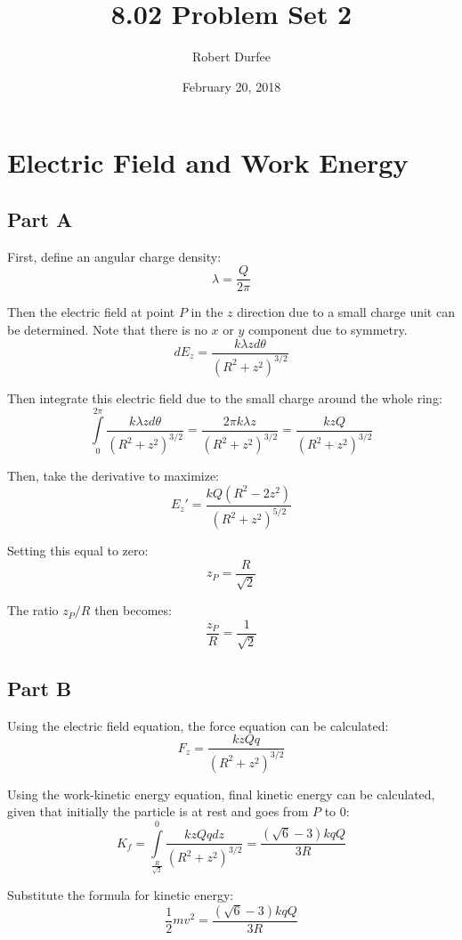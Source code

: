 \documentclass{article}
\title{ 8.02 Problem Set 2 }
\author{ Robert Durfee }
\date{ February 20, 2018 }
\begin{document}
\maketitle

\section{ Electric Field and Work Energy }

\subsection*{Part A}

First, define an angular charge density:
$$ \lambda = \frac{ Q }{ 2 \pi } $$

Then the electric field at point $P$ in the $z$ direction due to a small charge
unit can be determined. Note that there is no $x$ or $y$ component due to
symmetry.
$$ dE_{z} = \frac{ k \lambda z d\theta }{ \left( R^{2} + z^{2} \right)^{3/2} } $$

Then integrate this electric field due to the small charge around the whole
ring:
$$ \int\limits_{0}^{2\pi} \frac{ k \lambda z d\theta }{ \left( R^{2} + z^{2}
\right)^{3/2} } = \frac{ 2 \pi k \lambda z }{ \left( R^{2} + z^{2}
\right)^{3/2} } = \frac{ k z Q }{ \left( R^{2} + z^{2}
\right)^{3/2} } $$

Then, take the derivative to maximize:
$$ E_{z}' = \frac{ k Q \left( R^{2} - 2 z^{2} \right) }{ \left( R^{2} + z^{2}
\right)^{5/2} }$$

Setting this equal to zero:
$$ z_{P} = \frac{ R }{ \sqrt{2} } $$

The ratio $z_{P} / R$ then becomes:
$$ \frac{ z_{P} }{ R } = \frac{ 1 }{ \sqrt{2} } $$

\subsection*{Part B}

Using the electric field equation, the force equation can be calculated:
$$ F_{z} = \frac{ k z Q q }{ \left( R^{2} + z^{2} \right)^{3/2} }  $$

Using the work-kinetic energy equation, final kinetic energy can be calculated,
given that initially the particle is at rest and goes from $P$ to $0$:
$$ K_{f} = \int\limits_{\frac{ R }{ \sqrt{2} }}^{0} \frac{ k z Q q dz}{ \left(
R^{2} + z^{2} \right)^{3/2} } = \frac{ \left( \sqrt{6} - 3 \right) k q Q }{ 3 R } $$

Substitute the formula for kinetic energy:
$$ \frac{ 1 }{ 2 } m v^{2} =  \frac{ \left( \sqrt{6} - 3 \right) k q Q }{ 3 R }  $$
\end{document}
